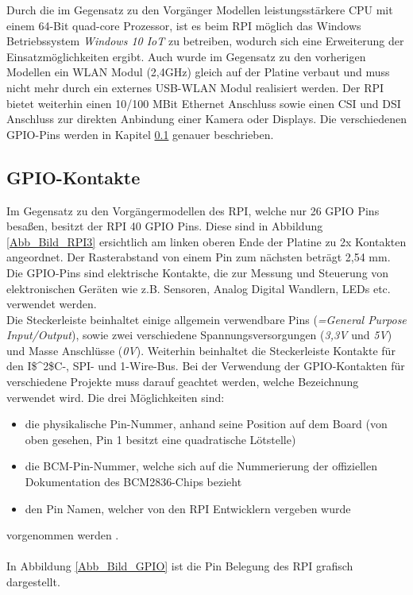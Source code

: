 Durch die im Gegensatz zu den Vorgänger Modellen leistungsstärkere CPU mit einem 64-Bit quad-core Prozessor, ist es beim RPI möglich das Windows Betriebssystem \textit{Windows 10 IoT} zu betreiben, wodurch sich eine Erweiterung der Einsatzmöglichkeiten ergibt. Auch wurde im Gegensatz zu den vorherigen Modellen  ein WLAN Modul (2,4\;GHz) gleich auf der Platine verbaut und muss nicht mehr durch ein externes USB-WLAN Modul realisiert werden. Der \ac{RPI} bietet weiterhin einen 10/100 MBit Ethernet Anschluss sowie einen \ac{CSI} und \ac{DSI} Anschluss zur direkten Anbindung einer Kamera oder Displays. Die verschiedenen GPIO-Pins werden in Kapitel \ref{subsection_GPIO} genauer beschrieben.

\subsection{GPIO-Kontakte}
\label{subsection_GPIO}
Im Gegensatz zu den Vorgängermodellen des \ac{RPI}, welche nur 26 GPIO Pins besaßen, besitzt der \ac{RPI} 40 GPIO Pins. Diese sind in Abbildung \ref{Abb_Bild_RPI3} ersichtlich am linken oberen Ende der Platine zu 2\;x Kontakten angeordnet. Der Rasterabstand von einem Pin zum nächsten beträgt 2,54 mm. Die GPIO-Pins sind elektrische Kontakte, die zur Messung und Steuerung von elektronischen Geräten wie z.B. Sensoren, Analog Digital Wandlern, LEDs etc. verwendet werden.\\
Die Steckerleiste beinhaltet einige allgemein verwendbare Pins (\textit{=\;General Purpose Input\;/\;Output}), sowie zwei verschiedene Spannungsversorgungen (\textit{3,3\;V} und \textit{5\;V}) und Masse Anschlüsse (\textit{0\;V}). Weiterhin beinhaltet die Steckerleiste Kontakte für den \ac{I$^2$C}-, \ac{SPI}- und 1-Wire-Bus. Bei der Verwendung der GPIO-Kontakten für verschiedene Projekte muss darauf geachtet werden, welche Bezeichnung verwendet wird. Die drei Möglichkeiten sind:
\begin{itemize}
\item die physikalische Pin-Nummer, anhand seine Position auf dem Board (von oben gesehen, Pin 1 besitzt eine quadratische Lötstelle)
\item die BCM-Pin-Nummer, welche sich auf die Nummerierung der offiziellen Dokumentation des BCM2836-Chips bezieht
\item den Pin Namen, welcher von den \ac{RPI} Entwicklern vergeben wurde 
\end{itemize} 
vorgenommen werden \citep{Raspberri_Pi_Handbuch}.\\\\
In Abbildung \ref{Abb_Bild_GPIO} ist die Pin Belegung des \ac{RPI} grafisch dargestellt.

